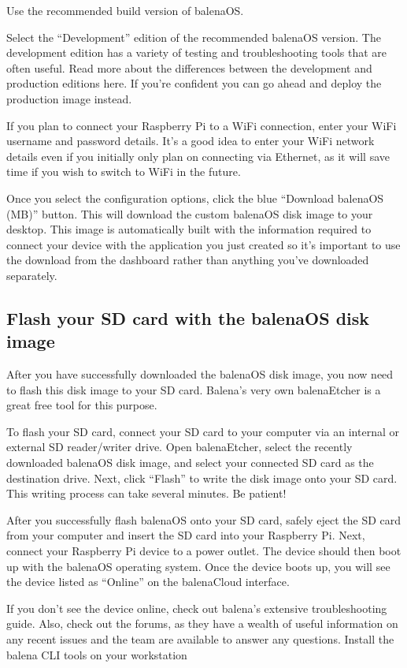     Use the recommended build version of balenaOS.

    Select the “Development” edition of the recommended balenaOS version. The development edition has a variety of testing and troubleshooting tools that are often useful. Read more about the differences between the development and production editions here. If you're confident you can go ahead and deploy the production image instead.

    If you plan to connect your Raspberry Pi to a WiFi connection, enter your WiFi username and password details. It's a good idea to enter your WiFi network details even if you initially only plan on connecting via Ethernet, as it will save time if you wish to switch to WiFi in the future.
    
Once you select the configuration options, click the blue “Download balenaOS (MB)” button. This will download the custom balenaOS disk image to your desktop. This image is automatically built with the information required to connect your device with the application you just created so it's important to use the download from the dashboard rather than anything you've downloaded separately.

\subsection*{Flash your SD card with the balenaOS disk image}

After you have successfully downloaded the balenaOS disk image, you now need to flash this disk image to your SD card. Balena’s very own balenaEtcher is a great free tool for this purpose.

To flash your SD card, connect your SD card to your computer via an internal or external SD reader/writer drive. Open balenaEtcher, select the recently downloaded balenaOS disk image, and select your connected SD card as the destination drive. Next, click “Flash” to write the disk image onto your SD card. This writing process can take several minutes. Be patient!

After you successfully flash balenaOS onto your SD card, safely eject the SD card from your computer and insert the SD card into your Raspberry Pi. Next, connect your Raspberry Pi device to a power outlet. The device should then boot up with the balenaOS operating system. Once the device boots up, you will see the device listed as “Online” on the balenaCloud interface.

If you don’t see the device online, check out balena's extensive troubleshooting guide. Also, check out the forums, as they have a wealth of useful information on any recent issues and the team are available to answer any questions.
Install the balena CLI tools on your workstation

